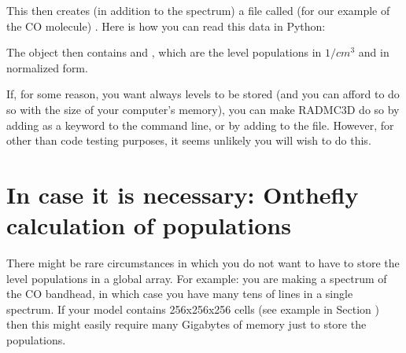 \documentclass[letterpaper,10pt,english]{sphinxmanual}
\begin{document}
\begin{sphinxVerbatim}[commandchars=\\\{\}]
      
\end{sphinxVerbatim}

This then creates (in addition to the spectrum) a file called (for our
example of the CO molecule) . Here is how you can read
this data in Python:

\begin{sphinxVerbatim}[commandchars=\\\{\}]
   
  
\end{sphinxVerbatim}

The  object then contains  and , which are
the level populations in \(1/cm^3\) and in normalized form.

If, for some reason, you want always  levels to be stored (and you can
afford to do so with the size of your computer’s memory), you can make RADMC\sphinxhyphen{}3D
do so by adding  as a keyword to the command line, or by adding
 to the  file. However, for other than
code testing purposes, it seems unlikely you will wish to do this.


\section{In case it is necessary: On\sphinxhyphen{}the\sphinxhyphen{}fly calculation of populations}
\label{\detokenize{lineradtrans:in-case-it-is-necessary-on-the-fly-calculation-of-populations}}\label{\detokenize{lineradtrans:sec-onthefly}}
There might be rare circumstances in which you do not want to have to store
the level populations in a global array. For example: you are making a spectrum
of the CO bandhead, in which case you have many tens of lines in a single
spectrum. If your model contains 256x256x256 cells (see example in Section
{\hyperref[\detokenize{lineradtrans:sec-calcstore-levpop}]{}}) then this might easily require many Gigabytes of
memory just to store the populations.
\end{document}
